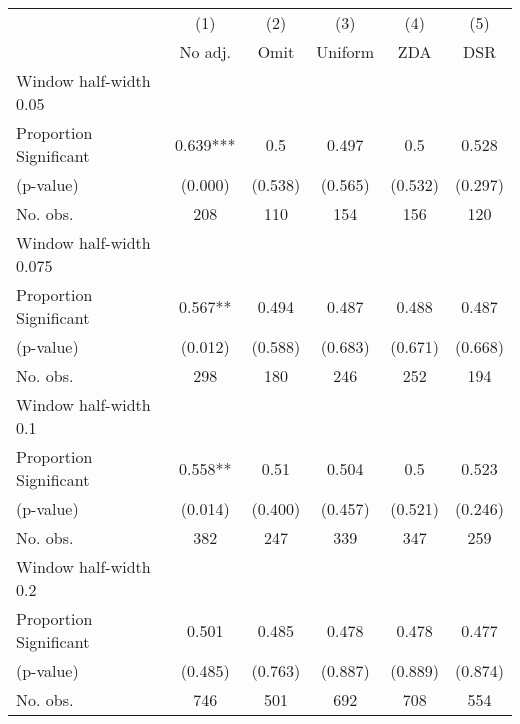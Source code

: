 
\def\sym#1{\ifmmode^{#1}\else\(^{#1}\)\fi}
\begin{tabular}{l*{5}{c}}
\hline\hline
& \multicolumn{1}{c}{(1)} &  \multicolumn{1}{c}{(2)} &  \multicolumn{1}{c}{(3)} &  \multicolumn{1}{c}{(4)} &  \multicolumn{1}{c}{(5)}\\
& \multicolumn{1}{c}{No adj.} &  \multicolumn{1}{c}{Omit} &  \multicolumn{1}{c}{Uniform} &  \multicolumn{1}{c}{ZDA} &  \multicolumn{1}{c}{DSR}\\

\hline
\hline
Window half-width 0.05\\

Proportion Significant& 0.639*** &  0.5 &  0.497 &  0.5 &  0.528\\

(p-value) & (0.000) &  (0.538) &  (0.565) &  (0.532) &  (0.297)\\

No. obs.& 208 &  110 &  154 &  156 &  120\\

\hline
Window half-width 0.075\\

Proportion Significant& 0.567** &  0.494 &  0.487 &  0.488 &  0.487\\

(p-value) & (0.012) &  (0.588) &  (0.683) &  (0.671) &  (0.668)\\

No. obs.& 298 &  180 &  246 &  252 &  194\\

\hline
Window half-width 0.1\\

Proportion Significant& 0.558** &  0.51 &  0.504 &  0.5 &  0.523\\

(p-value) & (0.014) &  (0.400) &  (0.457) &  (0.521) &  (0.246)\\

No. obs.& 382 &  247 &  339 &  347 &  259\\

\hline
Window half-width 0.2\\

Proportion Significant& 0.501 &  0.485 &  0.478 &  0.478 &  0.477\\

(p-value) & (0.485) &  (0.763) &  (0.887) &  (0.889) &  (0.874)\\

No. obs.& 746 &  501 &  692 &  708 &  554\\


\end{tabular}
